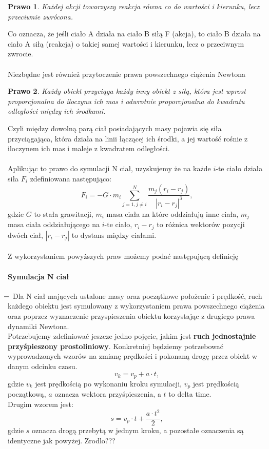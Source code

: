 \documentclass[14pt,twoside,a4paper]{article}
\newtheorem{theorem}{Prawo}
\begin{document}
\begin{theorem}
Każdej akcji towarzyszy reakcja równa co do wartości i kierunku, lecz przeciwnie zwrócona.
\end{theorem} 
Co oznacza, że jeśli ciało A działa na ciało B siłą F (akcja), to ciało B działa na ciało A siłą (reakcja) o takiej samej wartości i kierunku, lecz o przeciwnym zwrocie.\\~\\


Niezbędne jest również przytoczenie prawa powszechnego ciążenia Newtona \cite{fund}
\begin{theorem}
Każdy obiekt przyciąga każdy inny obiekt z siłą, która jest wprost proporcjonalna do iloczynu ich mas i odwrotnie proporcjonalna do kwadratu odległości między ich środkami.
\end{theorem}
Czyli między dowolną parą ciał posiadających masy pojawia się siła przyciągająca, która działa na linii łączącej ich środki, a jej wartość rośnie z iloczynem ich mas i maleje z kwadratem odległości.\\~\\

Aplikując to prawo do symulacji N ciał, uzyskujemy że na każde $i$-te ciało działa siła $F_i$ zdefiniowana następująco:\\
$$F_i = -G\cdot m_i \sum_{j=1, j\neq i}^N \frac{m_j(r_i - r_j)}{|r_i - r_j|^3},$$gdzie $G$ to stała grawitacji, $m_i$ masa ciała na które oddziałują inne ciała, $m_j$ masa ciała oddziałującego na $i$-te ciało, $r_i - r_j$ to różnica wektorów pozycji dwóch ciał, $|r_i - r_j|$ to dystans między ciałami. \\~\\
Z wykorzystaniem powyższych praw możemy podać następującą definicję
\paragraph{Symulacja N ciał} 
\newcommand{\mi}{\boldsymbol{} \mathrel{\mkern -16mu} \boldsymbol{-}}
$\mi$
Dla N ciał mających ustalone masy oraz początkowe położenie i prędkość, ruch każdego obiektu jest symulowany z wykorzystaniem prawa powszechnego ciążenia oraz poprzez wyznaczenie przyspieszenia obiektu korzystając z drugiego prawa dynamiki Newtona.\\
\bigskip
Potrzebujemy zdefiniować jeszcze jedno pojęcie, jakim jest \textbf{ruch jednostajnie przyśpieszony prostoliniowy}.
Konkretniej będziemy potrzebować wyprowadzonych wzorów na zmianę prędkości i pokonaną drogę przez obiekt w danym odcinku czasu.
$$v_k = v_p + a\cdot t,$$ gdzie $v_k$ jest prędkością po wykonaniu kroku symulacji, $v_p$ jest prędkością początkową, $a$ oznacza wektora przyśpieszenia, a $t$ to delta time.\\
Drugim wzorem jest:
$$s = v_p\cdot t + \frac{a\cdot t^2}{2},$$ gdzie $s$ oznacza drogą przebytą w jednym kroku, a pozostałe oznaczenia są identyczne jak powyżej. Zrodlo??? \\
\end{document}
